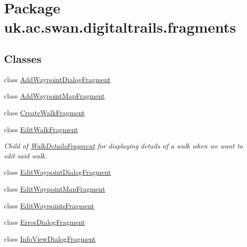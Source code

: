 \hypertarget{namespaceuk_1_1ac_1_1swan_1_1digitaltrails_1_1fragments}{\section{Package uk.\+ac.\+swan.\+digitaltrails.\+fragments}
\label{namespaceuk_1_1ac_1_1swan_1_1digitaltrails_1_1fragments}
}
\subsection*{Classes}
\begin{DoxyCompactItemize}
\item 
class \hyperlink{classuk_1_1ac_1_1swan_1_1digitaltrails_1_1fragments_1_1_add_waypoint_dialog_fragment}{Add\+Waypoint\+Dialog\+Fragment}
\item 
class \hyperlink{classuk_1_1ac_1_1swan_1_1digitaltrails_1_1fragments_1_1_add_waypoint_map_fragment}{Add\+Waypoint\+Map\+Fragment}
\item 
class \hyperlink{classuk_1_1ac_1_1swan_1_1digitaltrails_1_1fragments_1_1_create_walk_fragment}{Create\+Walk\+Fragment}
\item 
class \hyperlink{classuk_1_1ac_1_1swan_1_1digitaltrails_1_1fragments_1_1_edit_walk_fragment}{Edit\+Walk\+Fragment}
\begin{DoxyCompactList}\small\item\em Child of \hyperlink{classuk_1_1ac_1_1swan_1_1digitaltrails_1_1fragments_1_1_walk_details_fragment}{Walk\+Details\+Fragment} for displaying details of a walk when we want to edit said walk. \end{DoxyCompactList}\item 
class \hyperlink{classuk_1_1ac_1_1swan_1_1digitaltrails_1_1fragments_1_1_edit_waypoint_dialog_fragment}{Edit\+Waypoint\+Dialog\+Fragment}
\item 
class \hyperlink{classuk_1_1ac_1_1swan_1_1digitaltrails_1_1fragments_1_1_edit_waypoint_map_fragment}{Edit\+Waypoint\+Map\+Fragment}
\item 
class \hyperlink{classuk_1_1ac_1_1swan_1_1digitaltrails_1_1fragments_1_1_edit_waypoints_fragment}{Edit\+Waypoints\+Fragment}
\item 
class \hyperlink{classuk_1_1ac_1_1swan_1_1digitaltrails_1_1fragments_1_1_error_dialog_fragment}{Error\+Dialog\+Fragment}
\item 
class \hyperlink{classuk_1_1ac_1_1swan_1_1digitaltrails_1_1fragments_1_1_info_view_dialog_fragment}{Info\+View\+Dialog\+Fragment}

\end{DoxyCompactItemize}
